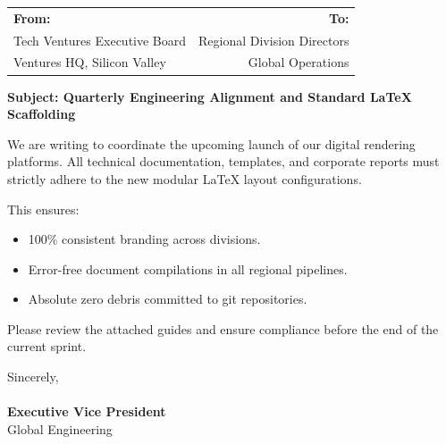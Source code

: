 \documentclass[11pt,a4paper]{article}
\begin{document}
\noindent
\begin{tabularx}{\textwidth}{@{}X r@{}}
    \textbf{From:} & \textbf{To:} \\
    Tech Ventures Executive Board & Regional Division Directors \\
    Ventures HQ, Silicon Valley & Global Operations \\
\end{tabularx}

\vspace{1cm}
\noindent
\textbf{Subject: Quarterly Engineering Alignment and Standard LaTeX Scaffolding}

\vspace{0.5cm}
We are writing to coordinate the upcoming launch of our digital rendering platforms. All technical documentation, templates, and corporate reports must strictly adhere to the new modular LaTeX layout configurations.

This ensures:
\begin{itemize}
    \item 100\% consistent branding across divisions.
    \item Error-free document compilations in all regional pipelines.
    \item Absolute zero debris committed to git repositories.
\end{itemize}

Please review the attached guides and ensure compliance before the end of the current sprint.

\vspace{2cm}
\noindent
Sincerely,\\
\vspace{1cm}\\
\textbf{Executive Vice President}\\
Global Engineering
\end{document}
